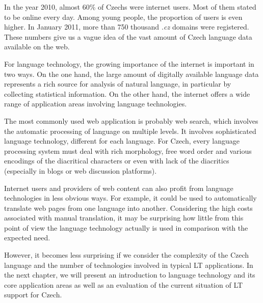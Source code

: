 \documentclass[]{../../metanetpaper}
\begin{document}
\begin{multicols}{2}
In the year 2010, almost 60\% of Czechs were internet users. Most of them stated to be online every day. Among young people, the proportion of users is even higher. In January 2011, more than 750 thousand \emph{.cz} domains were registered. These numbers give us a vague idea of the vast amount of Czech language data available on the web.

For language technology, the growing importance of the internet is important in two ways. On the one hand, the large amount of digitally available language data represents a rich source for analysis of natural language, in particular by collecting statistical information. On the other hand, the internet offers a wide range of application areas involving language technologies.

The most commonly used web application is probably web search, which involves the automatic processing of language on multiple levels. It involves sophisticated language technology, different for each language. For Czech, every language processing system must deal with rich morphology, free word order and various encodings of the diacritical characters or even with lack of the diacritics (especially in blogs or web discussion platforms).

Internet users and providers of web content can also profit from language technologies in less obvious ways. For example, it could be used to automatically translate web pages from one language into another.  Considering the high costs associated with manual translation, it may be surprising how little from this point of view the language technology actually is used in comparison with the expected need.

However, it becomes less surprising if we consider the complexity of the Czech language and the number of technologies involved in typical LT applications. In the next chapter, we will present an introduction to language technology and its core application areas as well as an evaluation of the current situation of LT support for Czech.
\end{multicols}
\clearpage
\end{document}
